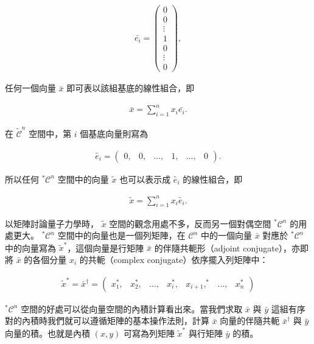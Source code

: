 \begin{align}\label{columnmatrix}
\bar{e_i}=\left(\begin{array}{c}0\\0\\\vdots\\1\\0\\\vdots\\0\end{array}\right),
\end{align}

任何一個向量 $\bar{x}$ 即可表以該組基底的線性組合，即

\begin{align}
\bar{x}=\sum_{i=1}^nx_i\bar{e_i}.
\end{align}

在 $ \tilde{\mathcal{C}}^n $ 空間中，第 $i$ 個基底向量則寫為

\begin{align}
\tilde{e_i}=\begin{pmatrix}0,&0,&\ldots, & 1, & \ldots, & 0 \end{pmatrix}.
\end{align}

所以任何 $ ^*\mathcal{C}^n $ 空間中的向量 $\tilde{x}$ 也可以表示成 $\tilde{e_i}$ 的線性組合，即 

\begin{align}
\tilde{x}=\sum_{i=1}^nx_i\tilde{e_i}.
\end{align}

以矩陣討論量子力學時， $\tilde{x}$ 空間的觀念用處不多，反而另一個對偶空間 $ ^*\mathcal{C}^n $ 的用處更大。 $ ^*\mathcal{C}^n $ 空間中的向量也是一個列矩陣，在 $ \mathcal{C}^n $ 中的一個向量 $\bar{x}$ 對應於 $ ^*\mathcal{C}^n $ 中的向量寫為 $\tilde{x}^*$，這個向量是行矩陣 $\bar{x}$ 的伴隨共軛形（adjoint conjugate），亦即將 $\bar{x}$ 的各個分量 $x_i$ 的共軛（complex conjugate）依序擺入列矩陣中：

\begin{align}
\tilde{x}^*=\bar{x}^\dag=\begin{pmatrix}x_1^*,&x_2^*,&\ldots, & x_i^*, & x_{i+1},^* & \ldots, & x_n^* \end{pmatrix}
\end{align}

$ ^*\mathcal{C}^n $ 空間的好處可以從向量空間的內積計算看出來。當我們求取 $\bar{x}$ 與 $\bar{y}$ 這組有序對的內積時我們就可以遵循矩陣的基本操作法則，計算 $\bar{x}$ 向量的伴隨共軛 $\bar{x}^\dag$ 與 $\bar{y}$ 向量的積。也就是內積 $(x,y)$ 可寫為列矩陣 $\tilde{x}^*$ 與行矩陣 $\bar{y}$ 的積。

